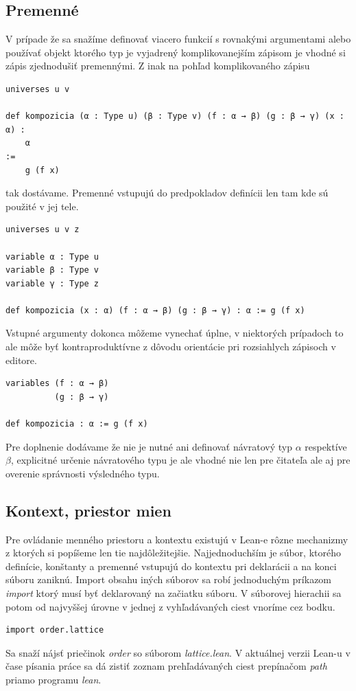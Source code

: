 \documentclass[a4paper,10pt,oneside]{report}%
\begin{document}
\subsection{Premenné}
    V prípade že sa snažíme definovať viacero funkcií s rovnakými argumentami alebo
používať objekt ktorého typ je vyjadrený komplikovanejším zápisom je vhodné si
zápis zjednodušiť premennými.
    Z inak na pohľad komplikovaného zápisu
\begin{lstlisting}
universes u v

def kompozicia (α : Type u) (β : Type v) (f : α → β) (g : β → γ) (x : α) :
    α
:=
    g (f x)
\end{lstlisting}
    tak dostávame.
    Premenné vstupujú do predpokladov definícii len tam kde sú použité v jej tele.
\begin{lstlisting}
universes u v z

variable α : Type u
variable β : Type v
variable γ : Type z

def kompozicia (x : α) (f : α → β) (g : β → γ) : α := g (f x)
\end{lstlisting}
    Vstupné argumenty dokonca môžeme vynechať úplne, v niektorých prípadoch to ale
môže byť kontraproduktívne z dôvodu orientácie pri rozsiahlych zápisoch v editore.
\begin{lstlisting}
variables (f : α → β)
          (g : β → γ)

def kompozicia : α := g (f x)
\end{lstlisting}
Pre doplnenie dodávame že nie je nutné ani definovať návratový typ $\alpha$
    respektíve $\beta$, explicitné určenie návratového typu je ale vhodné nie len
    pre čitateľa ale aj pre overenie správnosti výsledného typu.
\subsection{Kontext, priestor mien}
    Pre ovládanie menného priestoru a kontextu existujú v Lean-e rôzne mechanizmy
z ktorých si popíšeme len tie najdôležitejšie.
    Najjednoduchším je súbor, ktorého definície, konštanty a premenné vstupujú do
kontextu pri deklarácii a na konci súboru zaniknú.
    Import obsahu iných súborov sa robí jednoduchým príkazom \emph{import} ktorý
musí byť deklarovaný na začiatku súboru. V súborovej hierachii sa potom od najvyššej
úrovne v jednej z vyhľadávaných ciest vnoríme cez bodku.
\begin{lstlisting}
import order.lattice
\end{lstlisting}
    Sa snaží nájsť priečinok \emph{order} so súborom \emph{lattice.lean}.
    V aktuálnej verzii Lean-u v čase písania práce sa dá zistiť zoznam prehľadávaných
ciest prepínačom \emph{path} priamo programu \emph{lean}.
\end{document}
